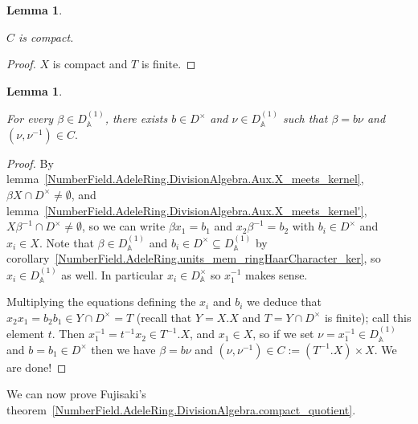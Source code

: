 \documentclass[10pt,a4paper]{article}
\newcommand{\A}{\mathbb{A}}
\newtheorem{lemma}[theorem]{Lemma}
\newcommand{\uses}[1]{}
\newcommand{\lean}[1]{}
\newcommand{\leanok}{}
\begin{document}
\begin{lemma}
  \label{NumberField.AdeleRing.DivisionAlgebra.Aux.C_compact}
  \lean{NumberField.AdeleRing.DivisionAlgebra.Aux.C_compact}
  \uses{NumberField.AdeleRing.DivisionAlgebra.Aux.C,
    NumberField.AdeleRing.DivisionAlgebra.Aux.T_finite,
    NumberField.AdeleRing.DivisionAlgebra.Aux.X_compact}
  \leanok
  $C$ is compact.
\end{lemma}
\begin{proof}
  \leanok
   $X$ is compact and $T$ is finite.
\end{proof}

\begin{lemma}
  \label{NumberField.AdeleRing.DivisionAlgebra.Aux.antidiag_mem_C}
  \lean{NumberField.AdeleRing.DivisionAlgebra.Aux.antidiag_mem_C}
  \uses{NumberField.AdeleRing.DivisionAlgebra.Aux.C}
  \leanok
  For every $\beta\in D_{\A}^{(1)}$, there exists $b\in D^\times$
  and $\nu\in D_{\A}^{(1)}$ such that $\beta=b\nu$ and $(\nu,\nu^{-1})\in C.$
\end{lemma}
\begin{proof}
  \leanok
  \uses{NumberField.AdeleRing.DivisionAlgebra.Aux.E,
    NumberField.AdeleRing.DivisionAlgebra.Aux.X_meets_kernel,
    NumberField.AdeleRing.DivisionAlgebra.Aux.X_meets_kernel',
    NumberField.AdeleRing.DivisionAlgebra.Aux.C}
  By lemma~\ref{NumberField.AdeleRing.DivisionAlgebra.Aux.X_meets_kernel},
  $\beta X\cap D^\times\not=\emptyset$,
  and lemma~\ref{NumberField.AdeleRing.DivisionAlgebra.Aux.X_meets_kernel'},
  $X\beta^{-1}\cap D^\times\not=\emptyset$,
  so we can write $\beta x_1=b_1$ and $x_2\beta^{-1}=b_2$ with $b_i\in D^\times$ and $x_i\in X$.
  Note that $\beta\in D_{\A}^{(1)}$ and $b_i\in D^{\times}\subseteq D_{\A}^{(1)}$ by
  corollary~\ref{NumberField.AdeleRing.units_mem_ringHaarCharacter_ker}, so $x_i\in D_{\A}^{(1)}$
  as well. In particular $x_i\in D_{\A}^\times$ so $x_1^{-1}$ makes sense.

  Multiplying the equations defining the $x_i$ and $b_i$ we deduce that
  $x_2x_1=b_2b_1\in Y\cap D^\times=T$ (recall that $Y=X.X$ and $T=Y\cap D^\times$
  is finite); call this element $t$. Then $x_1^{-1}=t^{-1}x_2\in T^{-1}.X$,
  and $x_1\in X$, so if we set $\nu=x_1^{-1}\in D_{\A}^{(1)}$
  and $b=b_1\in D^\times$ then we have $\beta=b\nu$ and $(\nu,\nu^{-1})\in C := (T^{-1}.X)\times X$.
  We are done!
\end{proof}

We can now prove Fujisaki's theorem~\ref{NumberField.AdeleRing.DivisionAlgebra.compact_quotient}.
\end{document}

